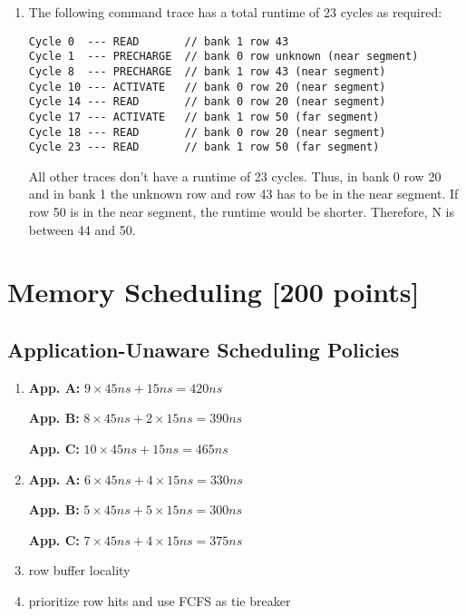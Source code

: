 \documentclass[a4paper]{article}
\begin{document}
\begin{enumerate}[label=\alph*)]
    \item The following command trace has a total runtime of 23 cycles as
        required:
\begin{lstlisting}
Cycle 0  --- READ       // bank 1 row 43
Cycle 1  --- PRECHARGE  // bank 0 row unknown (near segment)
Cycle 8  --- PRECHARGE  // bank 1 row 43 (near segment)
Cycle 10 --- ACTIVATE   // bank 0 row 20 (near segment)
Cycle 14 --- READ       // bank 0 row 20 (near segment)
Cycle 17 --- ACTIVATE   // bank 1 row 50 (far segment)
Cycle 18 --- READ       // bank 0 row 20 (near segment)
Cycle 23 --- READ       // bank 1 row 50 (far segment)
\end{lstlisting}
        All other traces don't have a runtime of 23 cycles. Thus, in bank 0 row
        20 and in bank 1 the unknown row and row 43 has to be in the near
        segment. If row 50 is in the near segment, the runtime would be
        shorter. Therefore, N is between 44 and 50.
\end{enumerate}

\section{Memory Scheduling [200 points]}

\subsection{Application-Unaware Scheduling Policies}

\begin{enumerate}[label=\alph*)]
    \item
        \textbf{App. A:} $9 \times 45ns + 15ns = 420ns$

        \textbf{App. B:} $8 \times 45ns + 2 \times 15ns = 390ns$

        \textbf{App. C:} $10 \times 45ns + 15ns = 465ns$

    \item
        \textbf{App. A:} $6 \times 45ns + 4 \times 15ns = 330ns$

        \textbf{App. B:} $5 \times 45ns + 5 \times 15ns = 300ns$

        \textbf{App. C:} $7 \times 45ns + 4 \times 15ns = 375ns$

    \item row buffer locality
    \item prioritize row hits and use FCFS as tie breaker
\end{enumerate}
\end{document}
